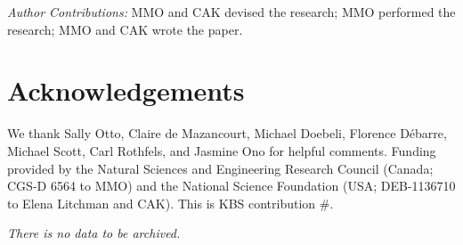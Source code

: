 \documentclass[12pt,letterpaper]{article} %
\begin{document}


\vspace{0.5cm}
\noindent \textit{Author Contributions:} MMO and CAK devised the research; MMO performed the research; MMO and CAK wrote the paper.

\section*{Acknowledgements}

We thank Sally Otto, Claire de Mazancourt, Michael Doebeli, Florence D\'ebarre, Michael Scott, Carl Rothfels, and Jasmine Ono for helpful comments. 
Funding provided by the Natural Sciences and Engineering Research Council (Canada; CGS-D 6564 to MMO) and the National Science Foundation (USA; DEB-1136710 to Elena Litchman and CAK).
This is KBS contribution \#.

\vspace{0.5cm}
\noindent \textit{There is no data to be archived.}
\end{document}
